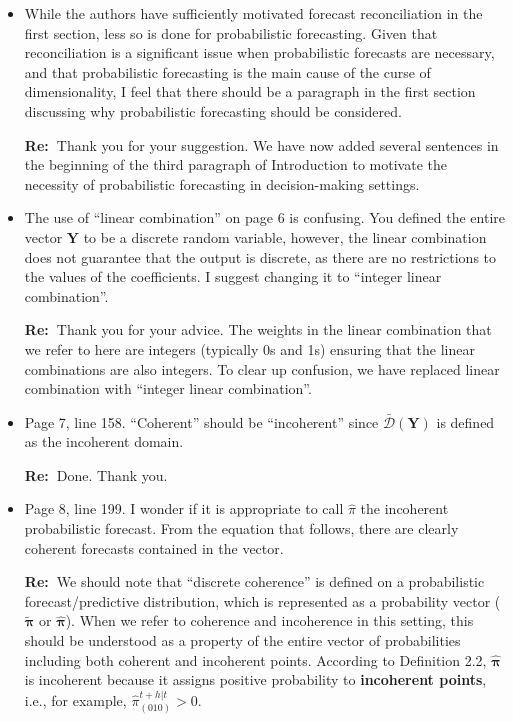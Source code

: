 \documentclass[11pt,a4paper]{article}
\newcommand{\RE}[2][Re:~]{{\color{blue}\textbf{#1}#2}}
\begin{document}
\begin{itemize}
    \item While the authors have sufficiently motivated forecast reconciliation in the first section, less so is done for probabilistic forecasting. Given that reconciliation is a significant issue when probabilistic forecasts are necessary, and that probabilistic forecasting is the main cause of the curse of dimensionality, I feel that there should be a paragraph in the first section discussing why probabilistic forecasting should be considered.
    
    \RE{Thank you for your suggestion. We have now added several sentences in the beginning of the third paragraph of Introduction to motivate the necessity of probabilistic forecasting in decision-making settings.}

    \item The use of ``linear combination'' on page 6 is confusing. You defined the entire vector $\mathbf{Y}$ to be a discrete random variable, however, the linear combination does not guarantee that the output is discrete, as there are no restrictions to the values of the coefficients. I suggest changing it to ``integer linear combination''.
    
    \RE{Thank you for your advice. The weights in the linear combination that we refer to here are integers (typically 0s and 1s) ensuring that the linear combinations are also integers. To clear up confusion, we have replaced linear combination with ``integer linear combination''.}

    \item  Page 7, line 158. ``Coherent'' should be ``incoherent'' since $\bar{\mathcal{D}}(\mathbf{Y})$ is defined as the
    incoherent domain.

    \RE{Done. Thank you.}

    \item Page 8, line 199. I wonder if it is appropriate to call $\hat{\pi}$ the incoherent probabilistic forecast. From the equation that follows, there are clearly coherent forecasts contained in the vector.
    
    \RE{We should note that ``discrete coherence'' is defined on a probabilistic forecast/predictive distribution, which is represented as a probability vector ($\tilde{\boldsymbol{\pi}}$ or $\hat{\boldsymbol{\pi}}$). When we refer to coherence and incoherence in this setting, this should be understood as a property of the entire vector of probabilities including both coherent and incoherent points. According to Definition 2.2, $\hat{\boldsymbol{\pi}}$ is incoherent because it assigns positive probability to \textbf{incoherent points}, i.e., for example, $\hat \pi^{t+h|t}_{(010)} > 0$}.


\end{itemize}
\end{document}
